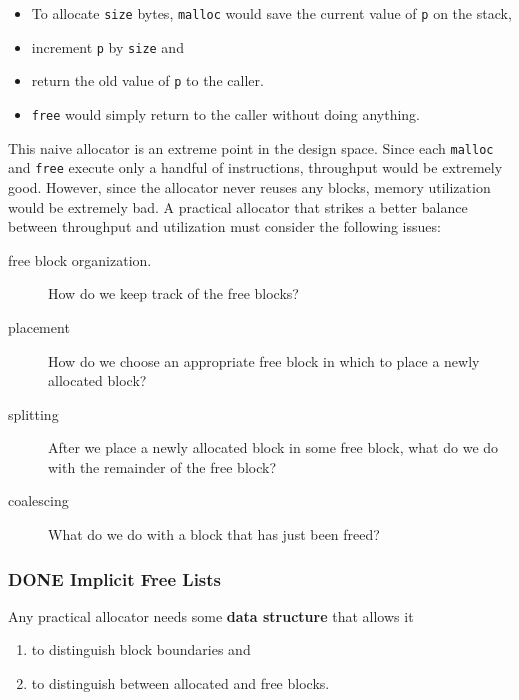 \documentclass[11pt]{article}
\begin{document}
\begin{itemize}
\item To allocate \texttt{size} bytes, \texttt{malloc} would save the current value of \texttt{p} on the stack,\\
\item increment \texttt{p} by \texttt{size} and\\
\item return the old value of \texttt{p} to the caller.\\
\item \texttt{free} would simply return to the caller without doing anything.\\
\end{itemize}

This naive allocator is an extreme point in the design space. Since each \texttt{malloc} and \texttt{free} execute only a handful of instructions, throughput would be extremely good. However, since the allocator never reuses any blocks, memory utilization would be extremely bad. A practical allocator that strikes a better balance between throughput and utilization must consider the following issues:\\
\begin{description}
\item[{free block organization.}] How do we keep track of the free blocks?\\
\item[{placement}] How do we choose an appropriate free block in which to place a newly allocated block?\\
\item[{splitting}] After we place a newly allocated block in some free block, what do we do with the remainder of the free block?\\
\item[{coalescing}] What do we do with a block that has just been freed?\\
\end{description}


\subsubsection{{\bfseries\sffamily DONE} Implicit Free Lists}
\label{sec:orgdced387}
Any practical allocator needs some \textbf{data structure} that allows it\\
\begin{enumerate}
\item to distinguish block boundaries and\\
\item to distinguish between allocated and free blocks.\\
\end{enumerate}
\end{document}
